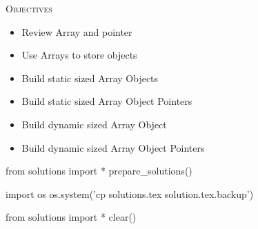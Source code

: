 
\textsc{Objectives}

\begin{itemize}
\item
  Review Array and pointer
\item
  Use Arrays to store objects
\item
  Build static sized Array Objects
\item
  Build static sized Array Object Pointers
\item
  Build dynamic sized Array Object
\item
  Build dynamic sized Array Object Pointers
\end{itemize}



\begin{python0}
from solutions import *
prepare_solutions()
\end{python0}
\begin{python}
import os
os.system('cp solutions.tex solution.tex.backup')  
\end{python}

\begin{python0}
from solutions import *
clear()
\end{python0}

